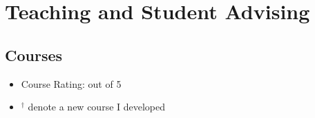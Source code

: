 \documentclass[11pt]{article}
\begin{document}



\section{Teaching and Student Advising}

\subsection{Courses}

\begin{itemize}[label={},before=\small]
    \item Course Rating: out of 5
    \item $^{\dagger}$ denote a new course I developed
\end{itemize}




\newcommand{\swe}[1]{SWE {#1}: OO Software Specification and Construction}
\end{document}
